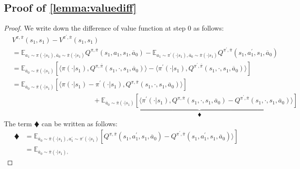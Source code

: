 \subsection{Proof of \cref{lemma:valuediff}}
\label{proof:valuedifflemma}
\begin{proof}
We write down the difference of value function at step 0 as follows:
\begin{equation}
\begin{split}
 &   V^{\pi, \overline{\pi}}(s_1,s_1) - 
        V^{\pi^\prime, \overline{\pi}}(s_1,s_1)
    \\ &      = \mathbb{E}_{a_1 \sim \pi(\cdot|s_1),
    \overline{a}_0 \sim \overline{\pi}(\cdot|s_1)}
     Q^{\pi,\overline{\pi}}(s_1,a_1,s_1,\overline{a}_0)
     -
     \mathbb{E}_{a_1 \sim \pi^\prime(\cdot|s_1),
    \overline{a}_0 \sim \overline{\pi}(\cdot|s_1)}
     Q^{\pi^\prime,\overline{\pi}}(s_1,a_1^\prime,s_1,\overline{a}_0)
     \\ & =\mathbb{E}_{\overline{a}_0 \sim \overline{\pi}(\cdot|s_1)} \left[
     \langle  \pi(\cdot|s_1 ), Q^{\pi,\overline{\pi}}(s_1, \cdot,s_1,\overline{a}_0)
     \rangle
     -
        \langle  \pi^\prime(\cdot|s_1 ), Q^{\pi^\prime,\overline{\pi}}(s_1, \cdot,s_1,\overline{a}_0)
     \rangle
     \right]
     \\ &= 
     \mathbb{E}_{\overline{a}_0 \sim \overline{\pi}(\cdot|s_1)} \left[
     \langle  \pi(\cdot|s_1 ) -\pi^\prime(\cdot|s_1 ) , Q^{\pi,\overline{\pi}}(s_1, \cdot,s_1,\overline{a}_0)
     \rangle \right]
          \\ &  \hspace{5cm} +  \underset{\vardiamond}{\underbrace{\mathbb{E}_{\overline{a}_0 \sim \overline{\pi}(\cdot|s_1)}   \left[
        \langle  \pi^\prime(\cdot|s_1 ), 
        Q^{\pi,\overline{\pi}}(s_1, \cdot,s_1,\overline{a}_0)-Q^{\pi^\prime,\overline{\pi}}(s_1, \cdot,s_1,\overline{a}_0) 
     \rangle      \right] }}
\end{split}
\end{equation}
The term $\vardiamond$ can be written as follows:
\begin{equation}
    \begin{split}
  \vardiamond   &= 
    \mathbb{E}_{\overline{a}_0 \sim \overline{\pi}(\cdot|s_1),
    a_1^\prime  \sim \pi^\prime(\cdot|s_1)
    }   \left[
        Q^{\pi,\overline{\pi}}(s_1, a_1^\prime ,s_1,\overline{a}_0)-Q^{\pi^\prime,\overline{\pi}}(s_1, a_1^\prime,s_1,\overline{a}_0) 
     \rangle      \right]
    \\  &  = 
     \mathbb{E}_{\overline{a}_0 \sim \overline{\pi}(\cdot|s_1),
}
\end{split}
\end{equation}
\end{proof}
